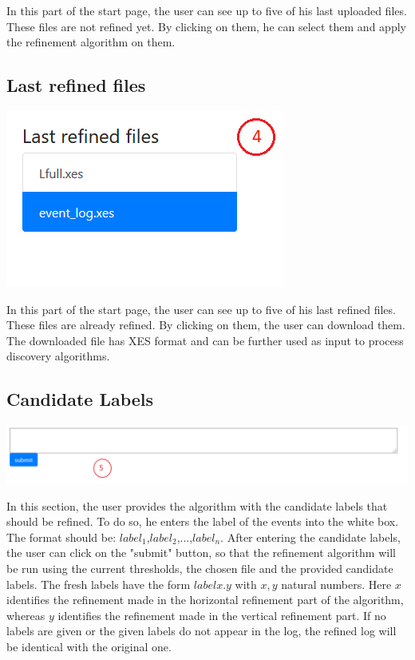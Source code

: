 \documentclass[notitlepage]{article}
\begin{document}
\begin{flushleft}
In this part of the start page, the user can see up to five of his last uploaded files. 
These files are not refined yet.
By clicking on them, he can select them and apply the refinement algorithm on them.

\subsection{Last refined files}

\includegraphics[scale=0.6]{lastRefinedFiles.png}

In this part of the start page, the user can see up to five of his last refined files. 
These files are already refined. 
By clicking on them, the user can download them.
The downloaded file has XES format and can be further used as input to process discovery algorithms.

\subsection{Candidate Labels}

\includegraphics[scale=0.5]{candidateLabels.png}

In this section, the user provides the algorithm with the candidate labels that should be refined. 
To do so, he enters the label of the events into the white box. 
The format should be: $label_1$,$label_2$,...,$label_n$.
After entering the candidate labels, the user can click on the "submit" button, so that the refinement algorithm will be run using the current thresholds, the chosen file and the provided candidate labels.
The fresh labels have the form $labelx.y$ with $x,y$ natural numbers.
Here $x$ identifies the refinement made in the horizontal refinement part of the algorithm, whereas $y$ identifies the refinement made in the vertical refinement part. 
If no labels are given or the given labels do not appear in the log, the refined log will be identical with the original one.





\end{flushleft}
\end{document}
